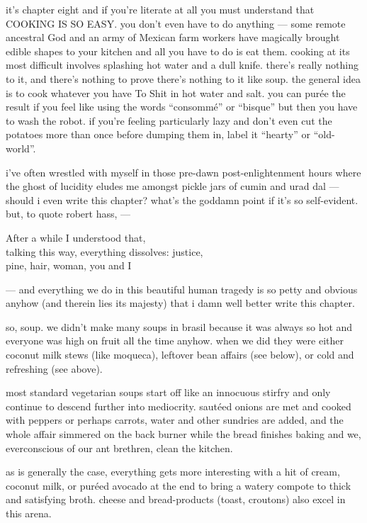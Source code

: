 it's chapter eight and if you're literate at all you must understand
that COOKING IS SO EASY. you don't even have to do anything --- some
remote ancestral God and an army of Mexican farm workers have
magically brought edible shapes to your kitchen and all you have to do
is eat them. cooking at its most difficult involves splashing hot
water and a dull knife. there's really nothing to it, and there's
nothing to prove there's nothing to it like soup. the general idea is
to cook whatever you have To Shit in hot water and salt. you can
pur\'{e}e the result if you feel like using the words ``consomm\'{e}''
or ``bisque'' but then you have to wash the robot. if you're feeling
particularly lazy and don't even cut the potatoes more than once
before dumping them in, label it ``hearty'' or ``old-world''.

i've often wrestled with myself in those pre-dawn post-enlightenment
hours where the ghost of lucidity eludes me amongst pickle jars of
cumin and urad dal --- should i even write this chapter? what's the
goddamn point if it's so self-evident. but, to quote robert hass, ---

\smallskip
\noindent
\makebox[1cm]{}After a while I understood that,\\
\makebox[1cm]{}talking this way, everything dissolves: justice,\\
\makebox[1cm]{}pine, hair, woman, you and I
\smallskip

--- and everything we do in this beautiful human tragedy is so petty
and obvious anyhow (and therein lies its majesty) that i damn well
better write this chapter.

so, soup. we didn't make many soups in brasil because it was always so
hot and everyone was high on fruit all the time anyhow. when we did
they were either coconut milk stews (like moqueca), leftover bean
affairs (see below), or cold and refreshing (see above).

most standard vegetarian soups start off like an innocuous stirfry and
only continue to descend further into mediocrity. saut\'{e}ed onions
are met and cooked with peppers or perhaps carrots, water and other
sundries are added, and the whole affair simmered on the back burner
while the bread finishes baking and we, everconscious of our ant
brethren, clean the kitchen.

as is generally the case, everything gets more interesting with a hit
of cream, coconut milk, or pur\'{e}ed avocado at the end to bring a
watery compote to thick and satisfying broth. cheese and
bread-products (toast, croutons) also excel in this arena.

